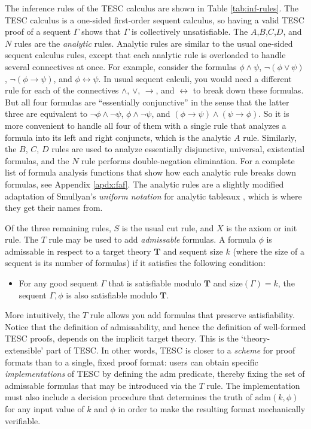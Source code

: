 \documentclass[12pt]{article}
\newcommand{\limp}[0]{\to}
\newcommand{\liff}[0]{\leftrightarrow}
\newcommand{\size}[0]{\mathrm{size}}
\begin{document}
The inference rules of the TESC calculus are shown in Table \ref{tab:inf-rules}.
The TESC calculus is a one-sided first-order sequent calculus, so having 
a valid TESC proof of a sequent $\Gamma$ shows that $\Gamma$ is collectively unsatisfiable.
The $A$,$B$,$C$,$D$, and $N$ rules are the \textit{analytic} rules. 
Analytic rules are similar to the usual one-sided sequent calculus rules, 
except that each analytic rule is overloaded to handle several connectives at once. 
For example, consider the formulas $\phi \land \psi$, $\lnot (\phi \lor \psi)$, 
$\lnot (\phi \limp \psi)$, and $\phi \liff \psi$. In usual sequent calculi, you would 
need a different rule for each of the connectives $\land$, $\lor$, $\limp$, and $\liff$ to 
break down these formulas. But all four formulas are ``essentially conjunctive'' 
in the sense that the latter three are equivalent to $\lnot \phi \land \lnot \psi$, 
$\phi \land \lnot \psi$, and $(\phi \limp \psi) \land (\psi \limp \phi)$.
So it is more convenient to handle all four of them with a single rule that analyzes 
a formula into its left and right conjuncts, which is the analytic $A$ rule.
Similarly, the $B$, $C$, $D$ rules are used to analyze essentially disjunctive, 
universal, existential formulas, and the $N$ rule performs double-negation elimination. 
For a complete list of formula analysis functions that show how each analytic 
rule breaks down formulas, see Appendix \ref{apdx:faf}. The analytic rules are 
a slightly modified adaptation of Smullyan's \textit{uniform notation} for analytic 
tableaux \cite{smullyan1995first}, which is where they get their names from. 

Of the three remaining rules, $S$ is the usual cut rule, and $X$ is the axiom or init rule. 
The $T$ rule may be used to add \textit{admissable} formulas. A formula $\phi$ is admissable 
in respect to a target theory $\mathbf{T}$ and sequent size $k$ (where the size of a sequent
is its number of formulas) if it satisfies the following condition:  
\begin{itemize}
  \item For any good sequent $\Gamma$ that is satisfiable modulo $\mathbf{T}$ and 
  $\size(\Gamma) = k$, the sequent $\Gamma, \phi$ is also satisfiable modulo $\mathbf{T}$. 
\end{itemize}
More intuitively, the $T$ rule allows you add formulas that preserve satisfiability. 
Notice that the definition of admissability, and hence the definition of well-formed 
TESC proofs, depends on the implicit target theory. This is the `theory-extensible' part of TESC. 
In other words, TESC is closer to a \textit{scheme} for proof formats than to a single, fixed proof format: 
users can obtain specific \textit{implementations} of TESC by defining the $\mathrm{adm}$ predicate, thereby 
fixing the set of admissable formulas that may be introduced via the $T$ rule. The implementation must also 
include a decision procedure that determines the truth of $\mathrm{adm}(k, \phi)$
for any input value of $k$ and $\phi$ in order to make the resulting format mechanically verifiable.  
\end{document}

